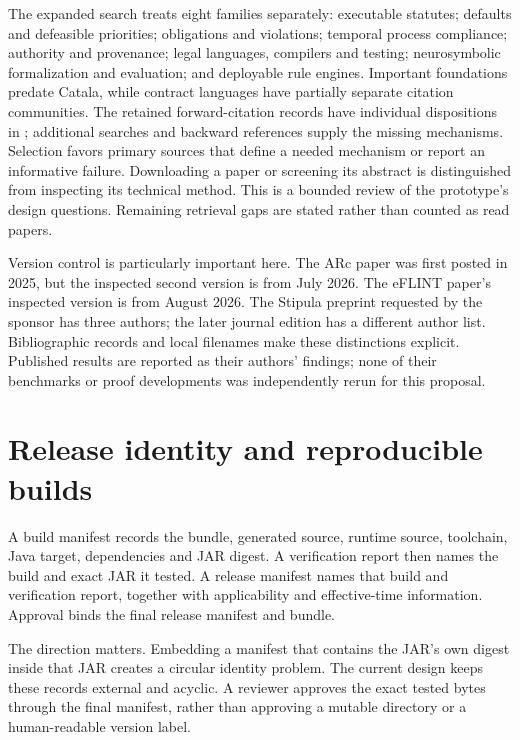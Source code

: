 \documentclass[12pt,a4paper,oneside,openany]{book}
\begin{document}
The expanded search treats eight families separately: executable statutes;
defaults and defeasible priorities; obligations and violations; temporal process
compliance; authority and provenance; legal languages, compilers and testing;
neurosymbolic formalization and evaluation; and deployable rule engines. Important
foundations predate Catala, while contract languages have partially separate
citation communities. The retained forward-citation records have individual
dispositions in ; additional searches and backward
references supply the missing mechanisms. Selection favors primary sources that
define a needed mechanism or report an informative failure. Downloading a paper
or screening its abstract is distinguished from inspecting its technical method.
This is a bounded review of the prototype's design questions. Remaining retrieval
gaps are stated rather than counted as read papers.

Version control is particularly important here. The ARc paper was first posted
in 2025, but the inspected second version is from July 2026. The eFLINT paper's
inspected version is from August 2026. The Stipula preprint requested by the
sponsor has three authors; the later journal edition has a different author list.
Bibliographic records and local filenames make these distinctions explicit.
Published results are reported as their authors' findings; none of their
benchmarks or proof developments was independently rerun for this proposal.

\section{Release identity and reproducible builds}
\label{sec:release-build-record}

A build manifest records the bundle, generated source, runtime source, toolchain,
Java target, dependencies and JAR digest. A verification report then names the
build and exact JAR it tested. A release manifest names that build and verification
report, together with applicability and effective-time information. Approval
binds the final release manifest and bundle.

The direction matters. Embedding a manifest that contains the JAR's own digest
inside that JAR creates a circular identity problem. The current design keeps
these records external and acyclic. A reviewer approves the exact tested bytes
through the final manifest, rather than approving a mutable directory or a
human-readable version label.
\end{document}
